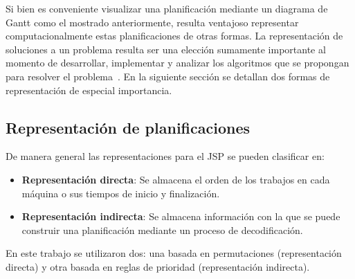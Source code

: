 Si bien es conveniente visualizar una planificación mediante un diagrama de Gantt como el mostrado anteriormente, resulta ventajoso representar computacionalmente 
estas planificaciones de otras formas. 
%
La representación de soluciones a un problema resulta ser una elección sumamente importante al momento de desarrollar, implementar y analizar los algoritmos que se 
propongan para resolver el problema~\cite{rothlauf2002representations}. 
%
En la siguiente sección se detallan dos formas de representación de especial importancia.

\subsection{Representación de planificaciones}
De manera general las representaciones para el JSP se pueden clasificar en\cite{Cheng1996}:
\begin{itemize}
    \item \textbf{Representación directa}: Se almacena el orden de los trabajos en cada máquina o sus tiempos de inicio y finalización.
    \item \textbf{Representación indirecta}: Se almacena información con la que se puede construir una planificación mediante un proceso de decodificación.
\end{itemize}

En este trabajo se utilizaron dos: una basada en permutaciones (representación directa) y otra basada en reglas de prioridad (representación indirecta).

